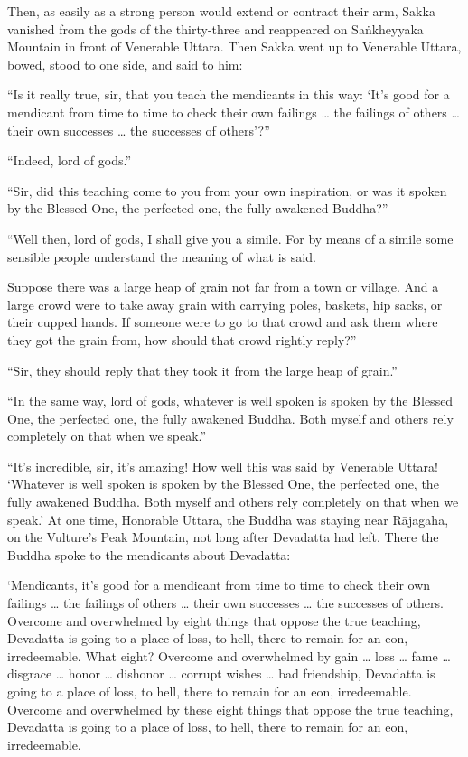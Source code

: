 \documentclass[12pt,openany]{book}%
\begin{document}
Then, as easily as a strong person would extend or contract their arm, Sakka vanished from the gods of the thirty-three and reappeared on \textsanskrit{Saṅkheyyaka} Mountain in front of Venerable Uttara. Then Sakka went up to Venerable Uttara, bowed, stood to one side, and said to him: 

“Is it really true, sir, that you teach the mendicants in this way: ‘It’s good for a mendicant from time to time to check their own failings … the failings of others … their own successes … the successes of others’?” 

“Indeed, lord of gods.” 

“Sir, did this teaching come to you from your own inspiration, or was it spoken by the Blessed One, the perfected one, the fully awakened Buddha?” 

“Well then, lord of gods, I shall give you a simile. For by means of a simile some sensible people understand the meaning of what is said. 

Suppose there was a large heap of grain not far from a town or village. And a large crowd were to take away grain with carrying poles, baskets, hip sacks, or their cupped hands. If someone were to go to that crowd and ask them where they got the grain from, how should that crowd rightly reply?” 

“Sir, they should reply that they took it from the large heap of grain.” 

“In the same way, lord of gods, whatever is well spoken is spoken by the Blessed One, the perfected one, the fully awakened Buddha. Both myself and others rely completely on that when we speak.” 

“It’s incredible, sir, it’s amazing! How well this was said by Venerable Uttara! ‘Whatever is well spoken is spoken by the Blessed One, the perfected one, the fully awakened Buddha. Both myself and others rely completely on that when we speak.’ At one time, Honorable Uttara, the Buddha was staying near \textsanskrit{Rājagaha}, on the Vulture’s Peak Mountain, not long after Devadatta had left. There the Buddha spoke to the mendicants about Devadatta: 

‘Mendicants, it’s good for a mendicant from time to time to check their own failings … the failings of others … their own successes … the successes of others. Overcome and overwhelmed by eight things that oppose the true teaching, Devadatta is going to a place of loss, to hell, there to remain for an eon, irredeemable. What eight? Overcome and overwhelmed by gain … loss … fame … disgrace … honor … dishonor … corrupt wishes … bad friendship, Devadatta is going to a place of loss, to hell, there to remain for an eon, irredeemable. Overcome and overwhelmed by these eight things that oppose the true teaching, Devadatta is going to a place of loss, to hell, there to remain for an eon, irredeemable. 
\end{document}
